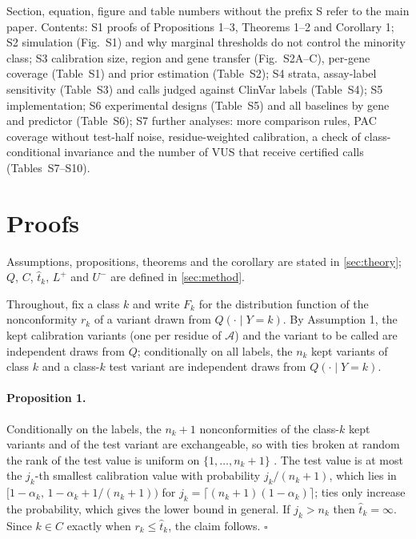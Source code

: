 \noindent Section, equation, figure and table numbers without the prefix S refer to the main paper. Contents: S1 proofs of
Propositions 1--3, Theorems 1--2 and Corollary 1; S2 simulation (Fig.~S1) and why marginal thresholds do not control the
minority class; S3 calibration size, region and gene transfer (Fig.~S2A--C), per-gene coverage (Table~S1) and prior
estimation (Table~S2); S4 strata, assay-label sensitivity (Table~S3) and calls judged against ClinVar labels
(Table~S4); S5 implementation; S6 experimental designs (Table~S5) and all baselines by gene and predictor (Table~S6); S7 further analyses: more
comparison rules, PAC coverage without test-half noise, residue-weighted calibration, a check of class-conditional
invariance and the number of VUS that receive certified calls (Tables~S7--S10).

\section{Proofs}\label{app:proofs}
Assumptions, propositions, theorems and the corollary are stated in \cref{sec:theory}; $Q$, $C$, $\hat t_k$, $L^+$
and $U^-$ are defined in \cref{sec:method}.


Throughout, fix a class $k$ and write $F_k$ for the distribution function of the nonconformity $r_k$ of a variant drawn
from $Q(\cdot\mid Y=k)$. By Assumption 1, the kept calibration variants (one per residue of $\mathcal A$)
and the variant to be called are independent draws from $Q$; conditionally on all labels, the $n_k$ kept variants of
class $k$ and a class-$k$ test variant are independent draws from $Q(\cdot\mid Y=k)$.

\paragraph{Proposition 1.}
Conditionally on the labels, the $n_k+1$ nonconformities of the class-$k$ kept variants and of the test variant are
exchangeable, so with ties broken at random the rank of the test value is uniform on $\{1,\dots,n_k+1\}$
\cite{Vovk2005,Angelopoulos2023}. The test value is at most the $j_k$-th smallest calibration value with probability
$j_k/(n_k+1)$, which lies in $[1-\alpha_k,\,1-\alpha_k+1/(n_k+1))$ for $j_k=\lceil (n_k+1)(1-\alpha_k)\rceil$; ties only
increase the probability, which gives the lower bound in general. If $j_k>n_k$ then $\hat t_k=\infty$. Since $k\in C$
exactly when $r_k\le\hat t_k$, the claim follows. \hfill$\square$

